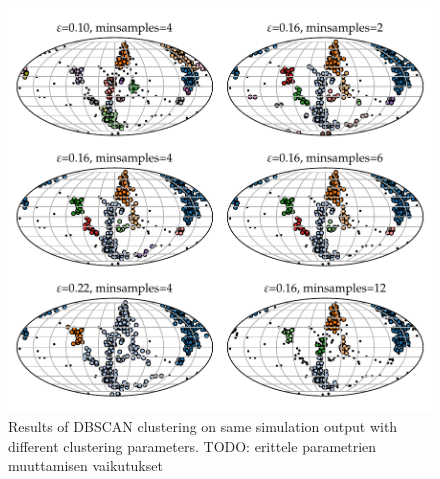 \documentclass[english, oneside]{HYgradu}
\begin{document}
\begin{figure}
    \centering
    \includegraphics{kuvat/clusteringExamples.pdf}
    \caption{Results of DBSCAN clustering on same simulation output with different clustering parameters. TODO: erittele parametrien muuttamisen vaikutukset}\label{fig:clusteringExamples}
\end{figure}
\end{document}
